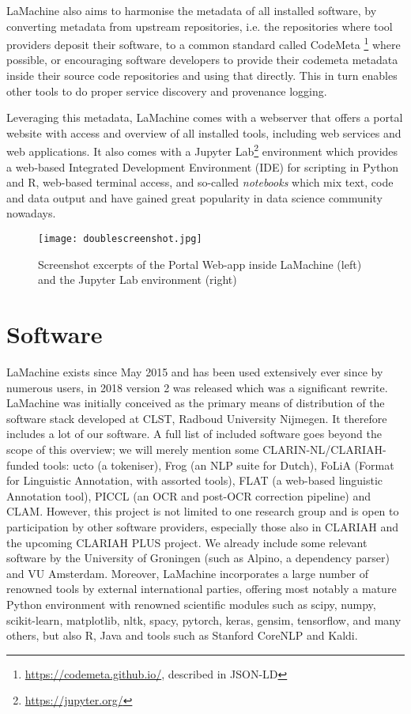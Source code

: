 \documentclass[a4paper,11pt]{article}
\begin{document}
LaMachine also aims to harmonise the metadata of all installed software, by converting metadata from upstream
repositories, i.e. the repositories where tool providers deposit their software, to a common standard called CodeMeta
\footnote{\url{https://codemeta.github.io/}, described in JSON-LD} \cite{codemeta,codemetar} where possible, or
encouraging software developers to provide their codemeta metadata inside their source code repositories and using
that directly. This in turn enables other tools to do proper service discovery and provenance logging.

Leveraging this metadata, LaMachine comes with a webserver that offers a portal website with
access and overview of all installed tools, including web services and web applications. It also comes with a
Jupyter Lab\footnote{\url{https://jupyter.org/}} environment which provides a web-based Integrated Development
Environment (IDE) for scripting in Python and R, web-based terminal access, and so-called \emph{notebooks} which mix
text, code and data output and have gained great popularity in data science community nowadays.


\begin{figure}[htb] \begin{center}
\texttt{[image: doublescreenshot.jpg]}
\end{center}
\caption{Screenshot excerpts of the Portal Web-app inside LaMachine (left) and the Jupyter Lab environment (right)}
\label{fig:arch}
\end{figure}

\section{Software}

LaMachine exists since May 2015 and has been used extensively ever since by numerous users, in 2018 version 2 was
released which was a significant rewrite. LaMachine was initially conceived as the primary means of distribution of the
software stack developed at CLST, Radboud University Nijmegen. It therefore includes a lot of our software.  A full list
of included software goes beyond the scope of this overview; we will merely mention some CLARIN-NL/CLARIAH-funded tools:
ucto (a tokeniser), Frog (an NLP suite for Dutch), FoLiA (Format for Linguistic Annotation, with assorted tools), FLAT
(a web-based linguistic Annotation tool), PICCL (an OCR and post-OCR correction pipeline) and CLAM. However, this
project is not limited to one research group and is open to participation by other software providers, especially those
also in CLARIAH and the upcoming CLARIAH PLUS project. We already include some relevant software by the University of
Groningen (such as Alpino, a dependency parser) and VU Amsterdam. Moreover, LaMachine incorporates a large number of
renowned tools by external international parties, offering most notably a mature Python environment with renowned
scientific modules such as scipy, numpy, scikit-learn, matplotlib, nltk, spacy, pytorch, keras, gensim, tensorflow, and many others,
but also R, Java and tools such as Stanford CoreNLP and Kaldi.
\end{document}
